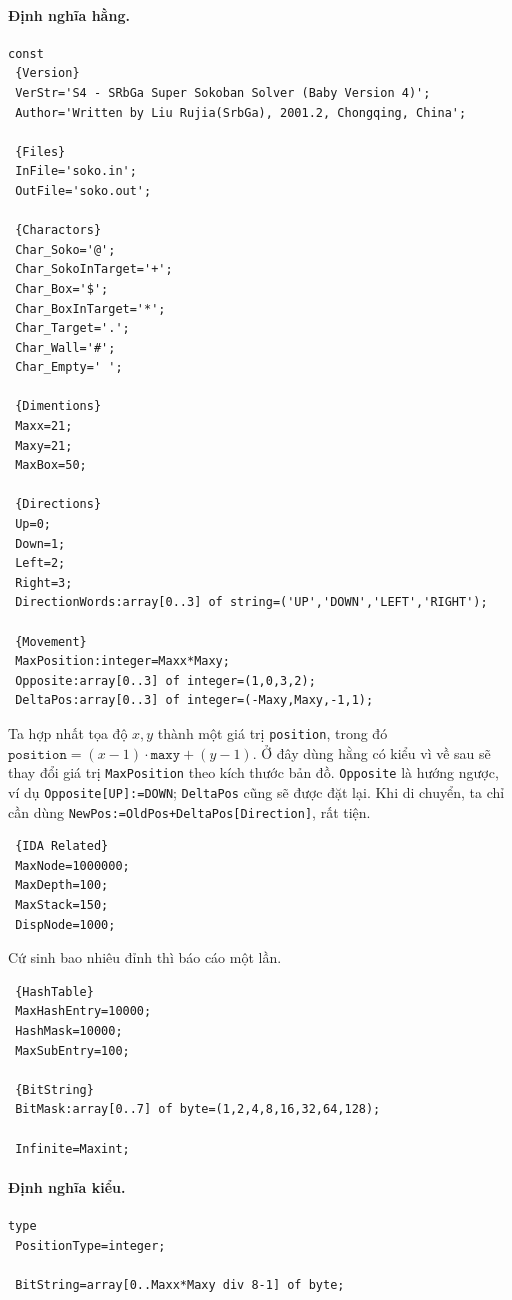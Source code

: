 \documentclass[11pt]{article}
\begin{document}
\paragraph{Định nghĩa hằng.}
\begin{verbatim}
const
 {Version}
 VerStr='S4 - SRbGa Super Sokoban Solver (Baby Version 4)';
 Author='Written by Liu Rujia(SrbGa), 2001.2, Chongqing, China';

 {Files}
 InFile='soko.in';
 OutFile='soko.out';

 {Charactors}
 Char_Soko='@';
 Char_SokoInTarget='+';
 Char_Box='$';
 Char_BoxInTarget='*';
 Char_Target='.';
 Char_Wall='#';
 Char_Empty=' ';

 {Dimentions}
 Maxx=21;
 Maxy=21;
 MaxBox=50;

 {Directions}
 Up=0;
 Down=1;
 Left=2;
 Right=3;
 DirectionWords:array[0..3] of string=('UP','DOWN','LEFT','RIGHT');

 {Movement}
 MaxPosition:integer=Maxx*Maxy;
 Opposite:array[0..3] of integer=(1,0,3,2);
 DeltaPos:array[0..3] of integer=(-Maxy,Maxy,-1,1);
\end{verbatim}

Ta hợp nhất tọa độ \(x,y\) thành một giá trị \texttt{position}, trong đó
\(\texttt{position}=(x-1)\cdot\texttt{maxy}+(y-1)\). Ở đây dùng hằng có kiểu
vì về sau sẽ thay đổi giá trị \texttt{MaxPosition} theo kích thước bản đồ.
\texttt{Opposite} là hướng ngược, ví dụ \texttt{Opposite[UP]:=DOWN};
\texttt{DeltaPos} cũng sẽ được đặt lại. Khi di chuyển, ta chỉ cần dùng
\texttt{NewPos:=OldPos+DeltaPos[Direction]}, rất tiện.

\begin{verbatim}
 {IDA Related}
 MaxNode=1000000;
 MaxDepth=100;
 MaxStack=150;
 DispNode=1000;
\end{verbatim}

Cứ sinh bao nhiêu đỉnh thì báo cáo một lần.

\begin{verbatim}
 {HashTable}
 MaxHashEntry=10000;
 HashMask=10000;
 MaxSubEntry=100;

 {BitString}
 BitMask:array[0..7] of byte=(1,2,4,8,16,32,64,128);

 Infinite=Maxint;
\end{verbatim}

\paragraph{Định nghĩa kiểu.}
\begin{verbatim}
type
 PositionType=integer;

 BitString=array[0..Maxx*Maxy div 8-1] of byte;
\end{verbatim}
\end{document}
